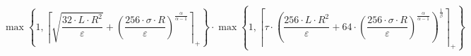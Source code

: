 \[\max\left\{ 1, \left\lceil \sqrt{\frac{32 \cdot L \cdot R^{2}}{\varepsilon}} + \left(\frac{256 \cdot \sigma \cdot R}{\varepsilon}\right)^{\frac{\alpha}{\alpha - 1}} \right\rceil_{+} \right\} \cdot \max\left\{ 1, \left\lceil \tau \cdot \left(\frac{256 \cdot L \cdot R^{2}}{\varepsilon} + 64 \cdot \left(\frac{256 \cdot \sigma \cdot R}{\varepsilon}\right)^{\frac{\alpha}{\alpha - 1}}\right)^{\frac{1}{\beta}} \right\rceil_{+} \right\}\]
